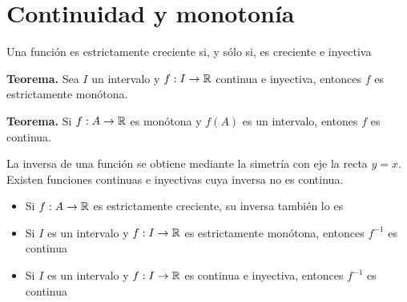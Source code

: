 \section{Continuidad y monotonía}
Una función es estrictamente creciente si, y sólo si, es creciente e inyectiva

\textbf{Teorema.} Sea $I$ un intervalo y $f:I\rightarrow\mathbb{R}$ continua e inyectiva, entonces $f$ es estrictamente monótona.

\textbf{Teorema.} Si $f:A\rightarrow\mathbb{R}$ es monótona y $f(A)$ es un intervalo, entones $f$ es continua.

La inversa de una función se obtiene  mediante la simetría con eje la recta $y=x$.
Existen funciones continuas e inyectivas cuya inversa no es continua.

\begin{itemize}
	\item Si $f:A\rightarrow\mathbb{R}$ es estrictamente creciente, su inversa también lo es
	\item Si $I$ es un intervalo y $f:I\rightarrow\mathbb{R}$ es estrictamente monótona, entonces $f^{-1}$ es continua
	\item Si $I$ es un intervalo y $f:I\rightarrow\mathbb{R}$ es continua e inyectiva, entonces $f^{-1}$ es continua
\end{itemize}